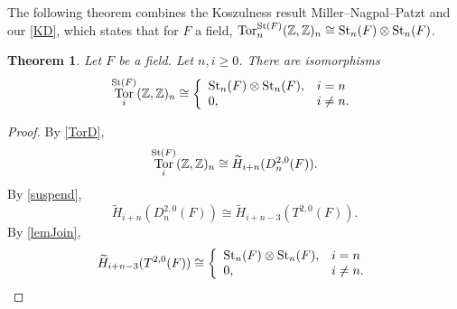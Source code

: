 \documentclass[a4paper]{amsart}
\DeclareMathOperator{\Tor}{Tor}
\newcommand{\Z}{\mathbb{Z}}
\numberwithin{theoremcounter}{section}
\newtheorem{theorem}[theoremauto]{Theorem}
\theoremstyle{definition}
\theoremstyle{remark}
\newcommand{\mr}[1]{{\rm #1}}
\newcommand{\St}{\mr{St}}
\begin{document}
The following theorem combines the Koszulness result Miller--Nagpal--Patzt \cite[Theorem 1.4]{MNP}  and our \autoref{KD}, which states that for $F$ a field, $\Tor_n^{\St(F)}(\Z,\Z)_n \cong \St_n(F) \otimes \St_n(F)$. 
\begin{theorem} Let $F$ be a field. Let $n, i \geq 0$. There are isomorphisms
$$\Tor_i^{\St(F)}(\Z,\Z)_n \cong \left\{ \begin{array}{ll}  \St_n(F) \otimes \St_n(F), &  i=n \\ 0, & i \neq n. \end{array} \right. $$ 
\end{theorem} 

\begin{proof}
By \autoref{TorD}, $$\Tor_i^{\St(F)}(\Z,\Z)_n \cong \widetilde H_{i+n}(D^{2,0}_n(F)).$$ By \autoref{suspend}, $$\widetilde H_{i+n}(D^{2,0}_n(F)) \cong \widetilde H_{i+n-3}(T^{2,0}(F)).$$  By \autoref{lemJoin},  $$\widetilde H_{i+n-3}(T^{2,0}(F))  \cong \left\{ \begin{array}{ll}  \St_n(F) \otimes \St_n(F), &  i=n \\ 0, & i \neq n. \end{array} \right.$$ 
\end{proof}






\vspace{.5cm}
\end{document}
